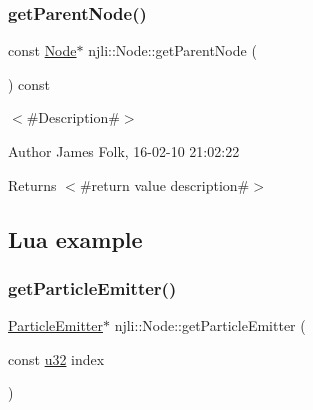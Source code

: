 \begin{DoxyCodeInclude}
\end{DoxyCodeInclude}
\mbox{\label{classnjli_1_1_node_a30973b8e0601decafa4a1b0fdc9eef50}} 
\subsubsection{\texorpdfstring{get\+Parent\+Node()}{getParentNode()}\hspace{0.1cm}{\footnotesize\ttfamily [2/2]}}
{\footnotesize\ttfamily const \mbox{\hyperlink{classnjli_1_1_node}{Node}}$\ast$ njli\+::\+Node\+::get\+Parent\+Node (\begin{DoxyParamCaption}{ }\end{DoxyParamCaption}) const}



$<$\#\+Description\#$>$ 

\begin{DoxyAuthor}{Author}
James Folk, 16-\/02-\/10 21\+:02\+:22
\end{DoxyAuthor}
\begin{DoxyReturn}{Returns}
$<$\#return value description\#$>$
\end{DoxyReturn}
\hypertarget{classnjli_1_1_steering_behavior_wander_ex1}{}\subsection{Lua example}\label{classnjli_1_1_steering_behavior_wander_ex1}

\begin{DoxyCodeInclude}
\end{DoxyCodeInclude}
\mbox{\label{classnjli_1_1_node_a863bf04366e0aeb8ac67fb062b7f9296}} 
\subsubsection{\texorpdfstring{get\+Particle\+Emitter()}{getParticleEmitter()}\hspace{0.1cm}{\footnotesize\ttfamily [1/2]}}
{\footnotesize\ttfamily \mbox{\hyperlink{classnjli_1_1_particle_emitter}{Particle\+Emitter}}$\ast$ njli\+::\+Node\+::get\+Particle\+Emitter (\begin{DoxyParamCaption}\item[{const \mbox{\hyperlink{_util_8h_a10e94b422ef0c20dcdec20d31a1f5049}{u32}}}]{index }\end{DoxyParamCaption})}



